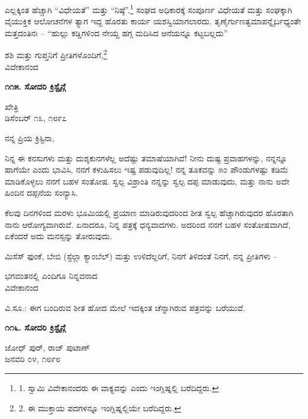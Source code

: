 ಎಲ್ಲಕ್ಕಿಂತ ಹೆಚ್ಚಾಗಿ “ವಿಧೇಯತೆ” ಮತ್ತು “ನಿಷ್ಠೆ”.\footnote{1. ಸ್ವಾಮಿ ವಿವೇಕಾನಂದರು ಈ ವಾಕ್ಯವನ್ನು  ಎಂದು ಇಂಗ್ಲಿಷ್ನಲ್ಲಿ ಬರೆದಿದ್ದರು.} ಸಂಘದ ಅಧಿಕಾರಕ್ಕೆ ಸಂಪೂರ್ಣ ವಿಧೇಯತೆ ಮತ್ತು ಸಂಘಕ್ಕಾಗಿ ವೈಯುಕ್ತಿಕ ಆಲೋಚನೆಗಳ ತ್ಯಾಗ ಇದ್ದ ಹೊರತು ಕಾರ್ಯ ಯಶಸ್ವಿಯಾಗಲಾರದು. ತೃಣೈರ್ಗುಣತ್ವಮಾಪನ್ನೈರ್ಬಧ್ಯಂತೇ ಮತ್ತದಂತಿನಃ – “ಹುಲ್ಲು ಕಡ್ಡಿಗಳಿಂದ ನೇಯ್ದ ಹಗ್ಗ ಮದಿಸಿದ ಆನೆಯನ್ನೂ ಕಟ್ಟಬಲ್ಲದು”

\begin{flushright}
ಶಶಿ ಮತ್ತು ಗುಪ್ತನಿಗೆ ಪ್ರೀತಿಗಳೊಂದಿಗೆ,\footnote{2. ಈ ಮುಕ್ತಾಯ ಪದಗಳನ್ನೂ ಇಂಗ್ಲಿಷ್ನಲ್ಲಿಯೇ ಬರೆದಿದ್ದರು.}\\ವಿವೇಕಾನಂದ
\end{flushright}

\begin{center}
\textbf{೧೧೫. ಸೋದರಿ ಕ್ರಿಸ್ಟೈನ್ಗೆ}
\end{center}

\begin{flushright}
ಖೇತ್ರಿ\\ಡಿಸೆಂಬರ್ ೧೩, ೧೮೯೭
\end{flushright}

ನನ್ನ ಪ್ರಿಯ ಕ್ರಿಸ್ಟಿನಾ,

ನಿನ್ನ ಈ ಕನಸುಗಳು ಮತ್ತು ದುಶ್ಶಕುನಗಳೆಲ್ಲ ಅದೆಷ್ಟು ತಮಾಷೆಯಾಗಿವೆ! ನೀನು ದುಷ್ಟ ಪ್ರವಾಹಗಳನ್ನು, ನನ್ನನ್ನೂ ಹಾಗೆಯೇ ಎಂದು ಭಾವಿಸಿ, ನನಗೆ ಕಳುಹಿಸಲು ಇಷ್ಟ ಪಡುವುದಿಲ್ಲ! ನನ್ನ ತೂಕವನ್ನು ೫೦ ಪೌಂಡುಗಳಷ್ಟು ಕಡಿಮೆ ಮಾಡಿಕೊಳ್ಳಲು ನನಗೆ ಬಹಳ ಸಂತೋಷ. ಸ್ವಲ್ಪ ವಿಶ್ರಾಂತಿ ನನ್ನನ್ನು ಸ್ವಲ್ಪ ದಪ್ಪ ಮಾಡುವುದು, ಮತ್ತು ನಾನು ಅದೇ ಹಿಂದಿನ ದಪ್ಪನೆಯ ಸಂನ್ಯಾಸಿ.

ಕೆಲವು ದಿನಗಳಿಂದ ಮರಳು ಭೂಮಿಯಲ್ಲಿ ಪ್ರಯಾಣ ಮಾಡಿರುವುದರಿಂದ ಶೀತ ಸ್ವಲ್ಪ ಹೆಚ್ಚಾಗಿರುವುದರ ಹೊರತಾಗಿ ನಾನು ಆರೋಗ್ಯವಾಗಿರುವೆ. ಏನಾದರೂ, ನಿನ್ನ ಪತ್ರಕ್ಕೆ ಧನ್ಯವಾದಗಳು. ಅದರಿಂದ ನನಗೆ ಬಹಳ ಸಂತೋಷವಾಗಿದೆ, ಏಕೆಂದರೆ ಅದು ಮನಸ್ಸನ್ನು ತೋರುವುದು.

ಮಿಸೆಸ್ ಫುಂಕೆ, ಬೇಬಿ (ಸ್ಟೆಲ್ಲಾ ಕ್ಯಾಂಬೆಲ್) ಮತ್ತು ಉಳಿದೆಲ್ಲರಿಗೆ, ನಿನಗೆ ತಿಳಿದಂತೆ ನಿನಗೆ, ನನ್ನ ಪ್ರೀತಿಗಳು –

\begin{flushright}
ಭಗವಂತನಲ್ಲಿ ಎಂದಿಗೂ ನಿನ್ನವನಾದ\\ವಿವೇಕಾನಂದ
\end{flushright}

ವಿ.ಸೂ.: ಈಗ ಬಂದಿರುವ ಶೀತ ಹೋದ ಮೇಲೆ ಇದಕ್ಕಿಂತ ಚೆನ್ನಾಗಿರುವ ಪತ್ರವನ್ನು ಬರೆಯುವೆ.

\begin{center}
\textbf{೧೧೬. ಸೋದರಿ ಕ್ರಿಸ್ಟೈನ್ಗೆ}
\end{center}

\begin{flushright}
ಜೋಧ್ ಪುರ್, ರಾಜ್ ಪುಟಾಣ್\\ಜನವರಿ ೦೪, ೧೮೯೮
\end{flushright}

